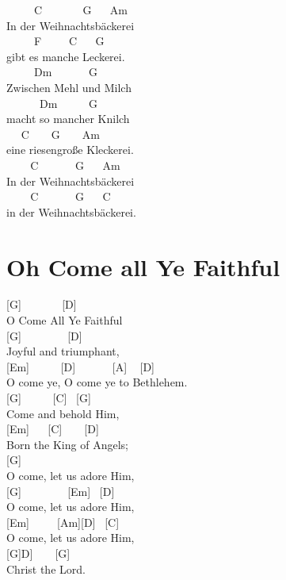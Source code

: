 \documentclass[
  letterpaper,
]{scrbook}
\begin{document}
~ ~ ~ C ~ ~ ~ ~ G ~ ~Am\\
In der Weihnachtsbäckerei\\
\hspace*{0.333em} ~ ~ ~ F ~ ~ ~C ~ ~G\\
gibt es manche Leckerei. ~ ~\\
\hspace*{0.333em} ~ ~ ~ Dm ~ ~ ~ ~G\\
Zwischen Mehl und Milch ~\\
\hspace*{0.333em} ~ ~ ~ ~Dm ~ ~ ~ G\\
macht so mancher Knilch ~ ~\\
\hspace*{0.333em} ~ ~C ~ ~ G ~ ~ Am\\
eine riesengroße Kleckerei.\\
\hspace*{0.333em} ~ ~ ~C ~ ~ ~ ~G ~ ~Am\\
In der Weihnachtsbäckerei ~\\
\hspace*{0.333em} ~ ~ ~C ~ ~ ~ ~G ~ ~C\\
in der Weihnachtsbäckerei.

\hypertarget{oh-come-all-ye-faithful}{%
\chapter{Oh Come all Ye Faithful}\label{oh-come-all-ye-faithful}}

{[}G{]} ~ ~ ~ ~ {[}D{]}\\
O Come All Ye Faithful\\
{[}G{]} ~ ~ ~ ~ ~{[}D{]}\\
Joyful and triumphant,\\
{[}Em{]} ~ ~ ~ {[}D{]} ~ ~ ~ ~{[}A{]} ~ {[}D{]}\\
O come ye, O come ye to Bethlehem.\\
{[}G{]} ~ ~ ~ {[}C{]} ~{[}G{]}\\
Come and behold Him,\\
{[}Em{]} ~ ~{[}C{]} ~ ~ {[}D{]}\\
Born the King of Angels;\\
{[}G{]}\\
O come, let us adore Him,\\
{[}G{]} ~ ~ ~ ~ ~{[}Em{]} ~{[}D{]}\\
O come, let us adore Him,\\
{[}Em{]} ~ ~ ~{[}Am{]}{[}D{]} ~{[}C{]}\\
O come, let us adore Him,\\
{[}G{]}D{]} ~ ~ {[}G{]}\\
Christ the Lord.
\end{document}
